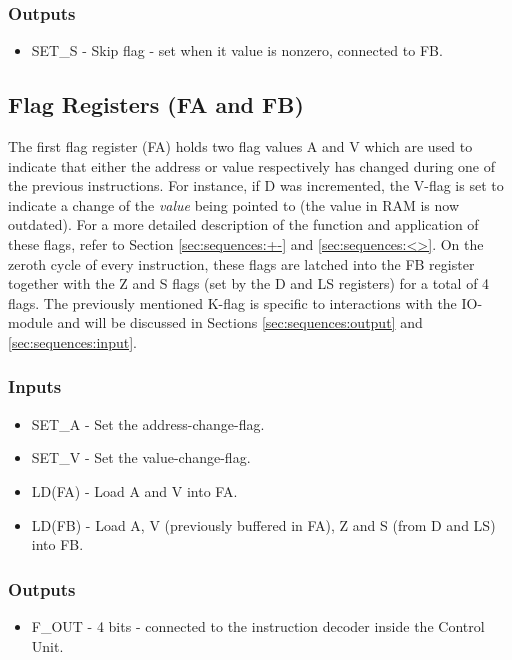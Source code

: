 \subsubsection*{Outputs}
\begin{itemize}
\itemsep0em 
\item SET\_S - Skip flag - set when it value is nonzero, connected to FB.
\end{itemize}

\subsection{Flag Registers (FA and FB)} \label{sec:architecture:flags}
The first flag register (FA) holds two flag values A and V which are used to indicate that either the address or value respectively has changed during one of the previous instructions. For instance, if D was incremented, the V-flag is set to indicate a change of the \emph{value} being pointed to (the value in RAM is now outdated). For a more detailed description of the function and application of these flags, refer to Section \ref{sec:sequences:+-} and \ref{sec:sequences:<>}. On the zeroth cycle of every instruction, these flags are latched into the FB register together with the Z and S flags (set by the D and LS registers) for a total of 4 flags. The previously mentioned K-flag is specific to interactions with the IO-module and will be discussed in Sections \ref{sec:sequences:output} and \ref{sec:sequences:input}.

\subsubsection*{Inputs}
\begin{itemize}
\itemsep0em 
\item SET\_A - Set the address-change-flag.
\item SET\_V - Set the value-change-flag.
\item LD(FA) - Load A and V into FA.
\item LD(FB) - Load A, V (previously buffered in FA), Z and S (from D and LS) into FB. 
\end{itemize}

\subsubsection*{Outputs}
\begin{itemize}
\itemsep0em 
\item F\_OUT - 4 bits - connected to the instruction decoder inside the Control Unit.
\end{itemize}


